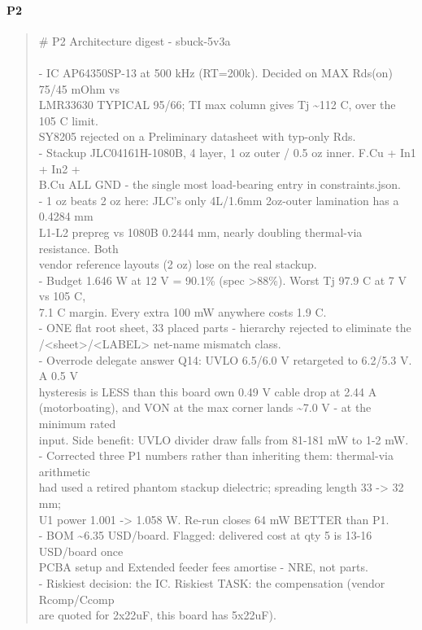 \documentclass[11pt,a4paper]{article}
\begin{document}
\paragraph*{P2}
\begin{quote}\small\ttfamily\raggedright
\# P2 Architecture digest - sbuck-5v3a\\
~\\
- IC AP64350SP-13 at 500 kHz (RT=200k). Decided on MAX Rds(on) 75/45 mOhm vs\\
  LMR33630 TYPICAL 95/66; TI max column gives Tj \textasciitilde{}112 C, over the 105 C limit.\\
  SY8205 rejected on a Preliminary datasheet with typ-only Rds.\\
- Stackup JLC04161H-1080B, 4 layer, 1 oz outer / 0.5 oz inner. F.Cu + In1 + In2 +\\
  B.Cu ALL GND - the single most load-bearing entry in constraints.json.\\
- 1 oz beats 2 oz here: JLC's only 4L/1.6mm 2oz-outer lamination has a 0.4284 mm\\
  L1-L2 prepreg vs 1080B 0.2444 mm, nearly doubling thermal-via resistance. Both\\
  vendor reference layouts (2 oz) lose on the real stackup.\\
- Budget 1.646 W at 12 V = 90.1\% (spec \textgreater{}88\%). Worst Tj 97.9 C at 7 V vs 105 C,\\
  7.1 C margin. Every extra 100 mW anywhere costs 1.9 C.\\
- ONE flat root sheet, 33 placed parts - hierarchy rejected to eliminate the\\
  /\textless{}sheet\textgreater{}/\textless{}LABEL\textgreater{} net-name mismatch class.\\
- Overrode delegate answer Q14: UVLO 6.5/6.0 V retargeted to 6.2/5.3 V. A 0.5 V\\
  hysteresis is LESS than this board own 0.49 V cable drop at 2.44 A\\
  (motorboating), and VON at the max corner lands \textasciitilde{}7.0 V - at the minimum rated\\
  input. Side benefit: UVLO divider draw falls from 81-181 mW to 1-2 mW.\\
- Corrected three P1 numbers rather than inheriting them: thermal-via arithmetic\\
  had used a retired phantom stackup dielectric; spreading length 33 -\textgreater{} 32 mm;\\
  U1 power 1.001 -\textgreater{} 1.058 W. Re-run closes 64 mW BETTER than P1.\\
- BOM \textasciitilde{}6.35 USD/board. Flagged: delivered cost at qty 5 is 13-16 USD/board once\\
  PCBA setup and Extended feeder fees amortise - NRE, not parts.\\
- Riskiest decision: the IC. Riskiest TASK: the compensation (vendor Rcomp/Ccomp\\
  are quoted for 2x22uF, this board has 5x22uF).
\end{quote}
\end{document}
